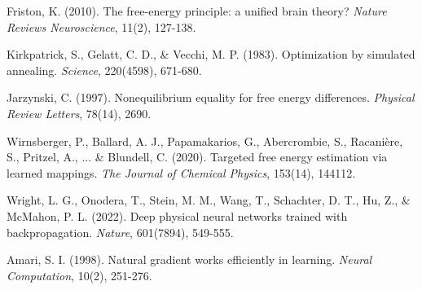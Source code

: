 \documentclass[12pt,a4paper]{article}
\begin{document}
\begin{enumerate}[leftmargin=1.5cm, label={[\arabic*]}]
\item Friston, K. (2010). The free-energy principle: a unified brain theory? \textit{Nature Reviews Neuroscience}, 11(2), 127-138.

\item Kirkpatrick, S., Gelatt, C. D., \& Vecchi, M. P. (1983). Optimization by simulated annealing. \textit{Science}, 220(4598), 671-680.

\item Jarzynski, C. (1997). Nonequilibrium equality for free energy differences. \textit{Physical Review Letters}, 78(14), 2690.

\item Wirnsberger, P., Ballard, A. J., Papamakarios, G., Abercrombie, S., Racanière, S., Pritzel, A., ... \& Blundell, C. (2020). Targeted free energy estimation via learned mappings. \textit{The Journal of Chemical Physics}, 153(14), 144112.

\item Wright, L. G., Onodera, T., Stein, M. M., Wang, T., Schachter, D. T., Hu, Z., \& McMahon, P. L. (2022). Deep physical neural networks trained with backpropagation. \textit{Nature}, 601(7894), 549-555.

\item Amari, S. I. (1998). Natural gradient works efficiently in learning. \textit{Neural Computation}, 10(2), 251-276.
\end{enumerate}
\end{document}
